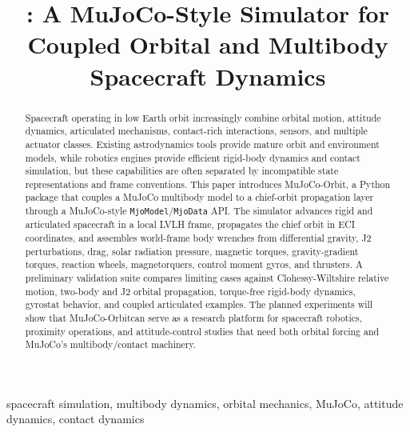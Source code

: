 \documentclass[conference]{IEEEtran}
\title{\mjorbit: A MuJoCo-Style Simulator for Coupled Orbital and Multibody
Spacecraft Dynamics}
\author{
\IEEEauthorblockN{John Zhang}
\IEEEauthorblockA{
Department / Lab Affiliation\\
University or Organization\\
Email: your.email@example.com}
}
\newcommand{\mjorbit}{MuJoCo-Orbit}
\begin{document}
\maketitle

\begin{abstract}
Spacecraft operating in low Earth orbit increasingly combine orbital motion,
attitude dynamics, articulated mechanisms, contact-rich interactions, sensors,
and multiple actuator classes. Existing astrodynamics tools provide mature
orbit and environment models, while robotics engines provide efficient
rigid-body dynamics and contact simulation, but these capabilities are often
separated by incompatible state representations and frame conventions. This
paper introduces \mjorbit, a Python package that couples a MuJoCo multibody
model to a chief-orbit propagation layer through a MuJoCo-style
\texttt{MjoModel}/\texttt{MjoData} API. The simulator advances rigid and
articulated spacecraft in a local LVLH frame, propagates the chief orbit in
ECI coordinates, and assembles world-frame body wrenches from differential
gravity, J2 perturbations, drag, solar radiation pressure, magnetic torques,
gravity-gradient torques, reaction wheels, magnetorquers, control moment
gyros, and thrusters. A preliminary validation suite compares limiting cases
against Clohessy-Wiltshire relative motion, two-body and J2 orbital
propagation, torque-free rigid-body dynamics, gyrostat behavior, and coupled
articulated examples. The planned experiments will show that \mjorbit can
serve as a research platform for spacecraft robotics, proximity operations,
and attitude-control studies that need both orbital forcing and MuJoCo's
multibody/contact machinery.
\end{abstract}

\begin{IEEEkeywords}
spacecraft simulation, multibody dynamics, orbital mechanics, MuJoCo,
attitude dynamics, contact dynamics
\end{IEEEkeywords}







\end{document}
